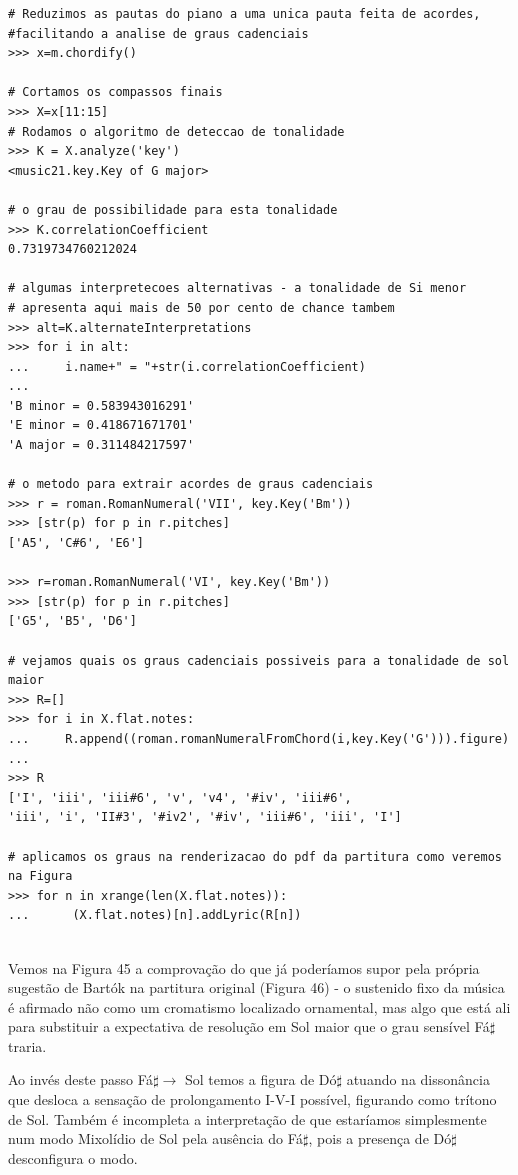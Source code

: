 \documentclass[
	12pt,				%
	openright,			%
	twoside,			%
	a4paper,			%
	english,			%
	french,				%
	spanish,			%
	brazil				%
	]{abntex2}
\begin{document}
\begin{lstlisting}
# Reduzimos as pautas do piano a uma unica pauta feita de acordes,
#facilitando a analise de graus cadenciais
>>> x=m.chordify()

# Cortamos os compassos finais
>>> X=x[11:15]
# Rodamos o algoritmo de deteccao de tonalidade
>>> K = X.analyze('key')
<music21.key.Key of G major>

# o grau de possibilidade para esta tonalidade
>>> K.correlationCoefficient
0.7319734760212024

# algumas interpretecoes alternativas - a tonalidade de Si menor
# apresenta aqui mais de 50 por cento de chance tambem
>>> alt=K.alternateInterpretations
>>> for i in alt:
...     i.name+" = "+str(i.correlationCoefficient)      
... 
'B minor = 0.583943016291'
'E minor = 0.418671671701'
'A major = 0.311484217597'

# o metodo para extrair acordes de graus cadenciais
>>> r = roman.RomanNumeral('VII', key.Key('Bm'))
>>> [str(p) for p in r.pitches]
['A5', 'C#6', 'E6']

>>> r=roman.RomanNumeral('VI', key.Key('Bm'))
>>> [str(p) for p in r.pitches]
['G5', 'B5', 'D6']

# vejamos quais os graus cadenciais possiveis para a tonalidade de sol maior
>>> R=[]
>>> for i in X.flat.notes:
...     R.append((roman.romanNumeralFromChord(i,key.Key('G'))).figure)
... 
>>> R
['I', 'iii', 'iii#6', 'v', 'v4', '#iv', 'iii#6', 
'iii', 'i', 'II#3', '#iv2', '#iv', 'iii#6', 'iii', 'I']

# aplicamos os graus na renderizacao do pdf da partitura como veremos na Figura
>>> for n in xrange(len(X.flat.notes)):
...      (X.flat.notes)[n].addLyric(R[n])


\end{lstlisting}

Vemos na Figura 45 a comprovação do que já poderíamos supor pela própria sugestão de Bartók na partitura original (Figura 46) - o sustenido fixo da música é afirmado não como um cromatismo localizado ornamental, mas algo que está ali para substituir a expectativa de resolução em Sol maior que o grau sensível Fá$\sharp$ traria. 

Ao invés deste passo Fá$\sharp \rightarrow $ Sol temos a figura de Dó$\sharp$ atuando na dissonância que desloca a sensação de prolongamento I-V-I possível, figurando como trítono de Sol. Também é incompleta a interpretação de que estaríamos simplesmente num modo Mixolídio de Sol pela ausência do Fá$\sharp$, pois a presença de Dó$\sharp$ desconfigura o modo.
\end{document}
